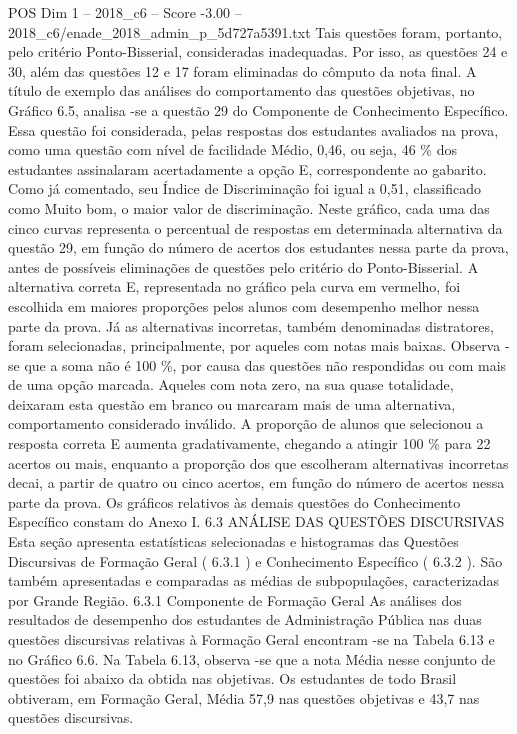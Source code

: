 \begin{textsample}{POS Dim 1 – 2018\_c6 – Score -3.00 – 2018\_c6/enade\_2018\_admin\_p\_5d727a5391.txt}
Tais questões foram, portanto, pelo critério Ponto-Bisserial, consideradas inadequadas.
Por isso, as questões 24 e 30, além das questões 12 e 17 foram eliminadas do cômputo da nota final.
A título de exemplo das análises do comportamento das questões objetivas, no Gráfico 6.5, analisa -se a questão 29 do Componente de Conhecimento Específico.
Essa questão foi considerada, pelas respostas dos estudantes avaliados na prova, como uma questão com nível de facilidade Médio, 0,46, ou seja, 46 \% dos estudantes assinalaram acertadamente a opção E, correspondente ao gabarito.
Como já comentado, seu Índice de Discriminação foi igual a 0,51, classificado como Muito bom, o maior valor de discriminação.
Neste gráfico, cada uma das cinco curvas representa o percentual de respostas em determinada alternativa da questão 29, em função do número de acertos dos estudantes nessa parte da prova, antes de possíveis eliminações de questões pelo critério do Ponto-Bisserial.
A alternativa correta E, representada no gráfico pela curva em vermelho, foi escolhida em maiores proporções pelos alunos com desempenho melhor nessa parte da prova.
Já as alternativas incorretas, também denominadas distratores, foram selecionadas, principalmente, por aqueles com notas mais baixas.
Observa -se que a soma não é 100 \%, por causa das questões não respondidas ou com mais de uma opção marcada.
Aqueles com nota zero, na sua quase totalidade, deixaram esta questão em branco ou marcaram mais de uma alternativa, comportamento considerado inválido.
A proporção de alunos que selecionou a resposta correta E aumenta gradativamente, chegando a atingir 100 \% para 22 acertos ou mais, enquanto a proporção dos que escolheram alternativas incorretas decai, a partir de quatro ou cinco acertos, em função do número de acertos nessa parte da prova.
Os gráficos relativos às demais questões do Conhecimento Específico constam do Anexo I. 6.3 ANÁLISE DAS QUESTÕES DISCURSIVAS Esta seção apresenta estatísticas selecionadas e histogramas das Questões Discursivas de Formação Geral ( 6.3.1 ) e Conhecimento Específico ( 6.3.2 ).
São também apresentadas e comparadas as médias de subpopulações, caracterizadas por Grande Região. 6.3.1 Componente de Formação Geral As análises dos resultados de desempenho dos estudantes de Administração Pública nas duas questões discursivas relativas à Formação Geral encontram -se na Tabela 6.13 e no Gráfico 6.6.
Na Tabela 6.13, observa -se que a nota Média nesse conjunto de questões foi abaixo da obtida nas objetivas.
Os estudantes de todo Brasil obtiveram, em Formação Geral, Média 57,9 nas questões objetivas e 43,7 nas questões discursivas.

\end{textsample}
